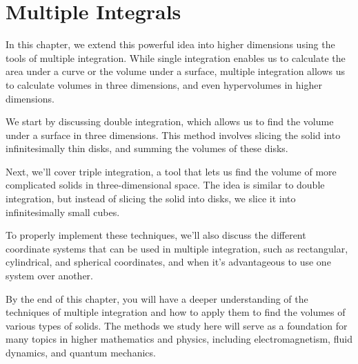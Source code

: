 \chapter{Multiple Integrals}


In this chapter, we extend this powerful idea into higher dimensions using the tools of multiple integration. While single integration enables us to calculate the area under a curve or the volume under a surface, multiple integration allows us to calculate volumes in three dimensions, and even hypervolumes in higher dimensions.

We start by discussing double integration, which allows us to find the volume under a surface in three dimensions. This method involves slicing the solid into infinitesimally thin disks, and summing the volumes of these disks.

Next, we'll cover triple integration, a tool that lets us find the volume of more complicated solids in three-dimensional space. The idea is similar to double integration, but instead of slicing the solid into disks, we slice it into infinitesimally small cubes.

To properly implement these techniques, we'll also discuss the different coordinate systems that can be used in multiple integration, such as rectangular, cylindrical, and spherical coordinates, and when it's advantageous to use one system over another.

By the end of this chapter, you will have a deeper understanding of the techniques of multiple integration and how to apply them to find the volumes of various types of solids. The methods we study here will serve as a foundation for many topics in higher mathematics and physics, including electromagnetism, fluid dynamics, and quantum mechanics.
